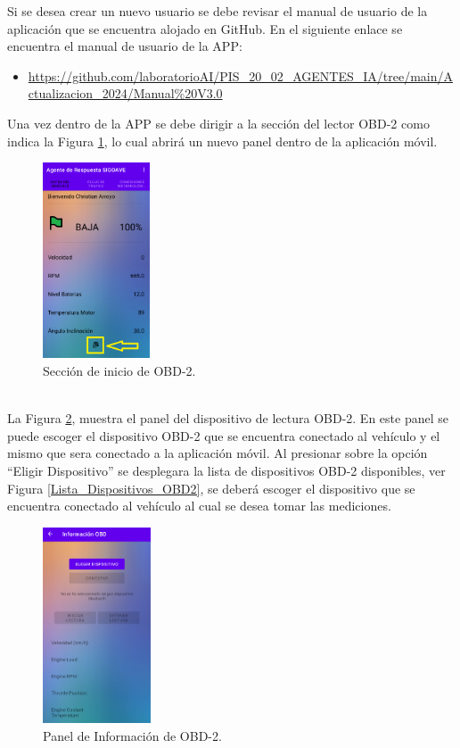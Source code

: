 \documentclass[a4paper,10pt, oneside, titlepage]{article}
\begin{document}
	\indent Si se desea crear un nuevo usuario se debe revisar el manual de usuario de la aplicación que se encuentra alojado en GitHub. En el siguiente enlace se encuentra el manual de usuario de la APP:
	\begin{itemize}
		\item \textcolor{blue}{\url{https://github.com/laboratorioAI/PIS_20_02_AGENTES_IA/tree/main/Actualizacion_2024/Manual\%20V3.0}}
	\end{itemize}
	\indent\indent Una vez dentro de la APP se debe dirigir a la sección del lector OBD-2 como indica la Figura \ref{Seccion_OBD2}, lo cual abrirá un nuevo panel dentro de la aplicación móvil.
	\begin{figure}[!h]
		\centering
		\includegraphics[width = 0.45\linewidth, height = 5.8cm]{Seccion_OBD2.png}
		\caption{Sección de inicio de OBD-2.}
		\label{Seccion_OBD2}
	\end{figure} \\
	\indent La Figura \ref{Informacion_OBD2}, muestra el panel del dispositivo de lectura OBD-2. En este panel se puede escoger el dispositivo OBD-2 que se encuentra conectado al vehículo y el mismo que sera conectado a la aplicación móvil. Al presionar sobre la opción ``Eligir Dispositivo'' se desplegara la lista de dispositivos OBD-2 disponibles, ver Figura \ref{Lista_Dispositivos_OBD2}, se deberá escoger el dispositivo que se encuentra conectado al vehículo al cual se desea tomar las mediciones.
	\begin{figure}[!h]
		\centering
		\includegraphics[width = 0.45\linewidth, height = 5.8cm]{Informacion_OBD2.png}
		\caption{Panel de Información de OBD-2.}
		\label{Informacion_OBD2}
	\end{figure}
\end{document}
